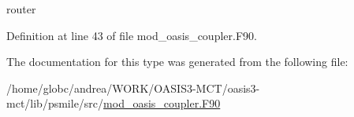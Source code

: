 router 



Definition at line 43 of file mod\+\_\+oasis\+\_\+coupler.\+F90.



The documentation for this type was generated from the following file\+:\begin{DoxyCompactItemize}
\item 
/home/globc/andrea/\+W\+O\+R\+K/\+O\+A\+S\+I\+S3-\/\+M\+C\+T/oasis3-\/mct/lib/psmile/src/\hyperlink{mod__oasis__coupler_8_f90}{mod\+\_\+oasis\+\_\+coupler.\+F90}\end{DoxyCompactItemize}
